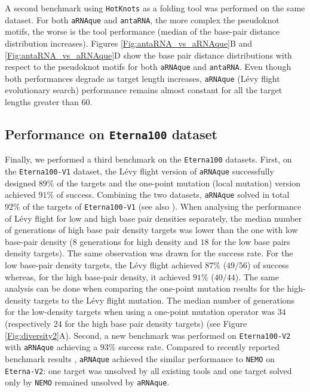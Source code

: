 A second benchmark using \texttt{HotKnots} as a folding tool was performed on the same dataset. For both \texttt{aRNAque} and \texttt{antaRNA}, the more complex the pseudoknot motifs, the worse is the tool performance (median of the base-pair distance distribution increases). Figures \ref{Fig:antaRNA_vs_aRNAque}B and \ref{Fig:antaRNA_vs_aRNAque}D show the base pair distance distributions with respect to the pseudoknot motifs for both \texttt{aRNAque} and \texttt{antaRNA}. Even though both performances degrade as target length increases, \texttt{aRNAque} (Lévy flight evolutionary search) performance remains almost constant for all the target lengths greater than $60$.


\subsection{Performance on \texttt{Eterna100} dataset}

Finally, we performed a third benchmark on the \texttt{Eterna100} datasets. First, on the \texttt{Eterna100-V1} dataset, the Lévy flight version of \texttt{aRNAque} successfully designed $89\%$ of the targets and the one-point mutation (local mutation) version achieved $91\%$ of success. Combining the two datasets, \texttt{aRNAque} solved in total $92\%$ of the targets of \texttt{Eterna100-V1} (see also \cite{merleau2021simple}). When analysing the performance of Lévy flight for low and high base pair densities separately, the median number of generations of high base pair density targets was lower than the one with low base-pair density ($8$ generations for high density and $18$ for the low base pairs density targets). The same observation was drawn for the success rate. For the low base-pair density targets, the Lévy flight achieved $87\%$ ($49/56$) of success whereas, for the high base-pair density, it achieved $91\%$ ($40/44$). The same analysis can be done when comparing the one-point mutation results for the high-density targets to the Lévy flight mutation. The median number of generations for the low-density targets when using a one-point mutation operator was $34$ (respectively $24$ for the high base pair density targets) (see Figure \ref{Fig:diversity2}A). Second, a new benchmark was performed on \texttt{Eterna100-V2} with \texttt{aRNAque} achieving a $93\%$ success rate. Compared to recently reported benchmark results \cite{Eterna}, \texttt{aRNAque} achieved the similar performance to \texttt{NEMO} on \texttt{Eterna-V2}: one target was unsolved by all existing tools and one target solved only by \texttt{NEMO} remained unsolved by \texttt{aRNAque}. 


